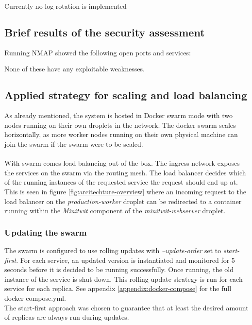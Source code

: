 \noindent
Currently no log rotation is implemented

\subsection{Brief results of the security assessment}
Running NMAP showed the following open ports and services:

None of these have any exploitable weaknesses. 

\subsection{Applied strategy for scaling and load balancing}
As already mentioned, the system is hosted in Docker swarm mode with two nodes running on their own droplets in the network. The docker swarm scales horizontally, as more worker nodes running on their own physical machine can join the swarm if the swarm were to be scaled. \\
\\
With swarm comes load balancing out of the box. The ingress network exposes the services on the swarm via the routing mesh. The load balancer decides which of the running instances of the requested service the request should end up at\cite{docker-ingress}. This is seen in figure \ref{fig:arcitechture-overview} where an incoming request to the load balancer on the \textit{production-worker} droplet can be redirected to a container running within the \textit{Minitwit} component of the \textit{minitwit-webserver} droplet.

\subsubsection{Updating the swarm}
The swarm is configured to use rolling updates with \textit{--update-order} set to \textit{start-first}. For each service, an updated version is instantiated and monitored for 5 seconds before it is decided to be running successfully. Once running, the old instance of the service is shut down. This rolling update strategy is run for each service for each replica. See appendix \ref{appendix:docker-compose} for the full docker-compose.yml.\\
The start-first approach was chosen to guarantee that at least the desired amount of replicas are always run during updates.
